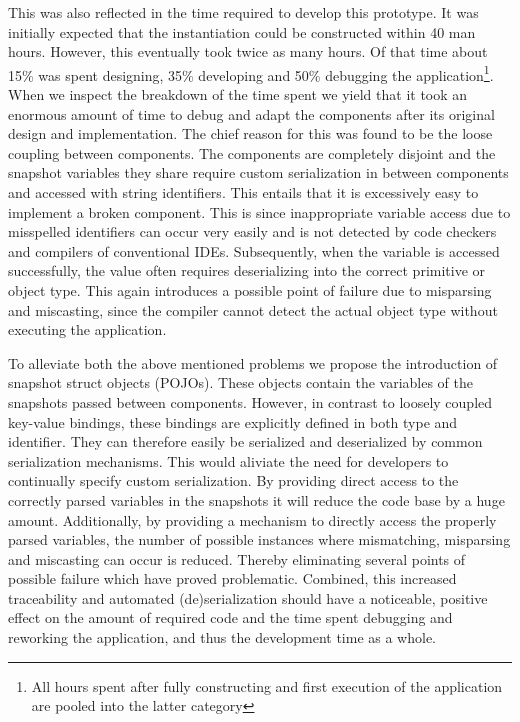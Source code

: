 This was also reflected in the time required to develop this prototype. It was initially expected that the instantiation could be constructed within 40 man hours. However, this eventually took twice as many hours. Of that time about 15\% was spent designing, 35\% developing and 50\% debugging the application\footnote{All hours spent after fully constructing and first execution of the application are pooled into the latter category}. When we inspect the breakdown of the time spent we yield that it took an enormous amount of time to debug and adapt the components after its original design and implementation. The chief reason for this was found to be the loose coupling between components. The components are completely disjoint and the snapshot variables they share require custom serialization in between components and accessed with string identifiers. This entails that it is excessively easy to implement a broken component. This is since inappropriate variable access due to misspelled identifiers can occur very easily and is not detected by code checkers and compilers of conventional IDEs. Subsequently, when the variable is accessed successfully, the value often requires deserializing into the correct primitive or object type. This again introduces a possible point of failure due to misparsing and miscasting, since the compiler cannot detect the actual object type without executing the application.

To alleviate both the above mentioned problems we propose the introduction of snapshot struct objects (POJOs). These objects contain the variables of the snapshots passed between components. However, in contrast to loosely coupled key-value bindings, these bindings are explicitly defined in both type and identifier. They can therefore easily be serialized and deserialized by common serialization mechanisms. This would aliviate the need for developers to continually specify custom serialization. By providing direct access to the correctly parsed variables in the snapshots it will reduce the code base by a huge amount. Additionally, by providing a mechanism to directly access the properly parsed variables, the number of possible instances where mismatching, misparsing and miscasting can occur is reduced. Thereby eliminating several points of possible failure which have proved problematic. Combined, this increased traceability and automated (de)serialization should have a noticeable, positive effect on the amount of required code and the time spent debugging and reworking the application, and thus the development time as a whole.

